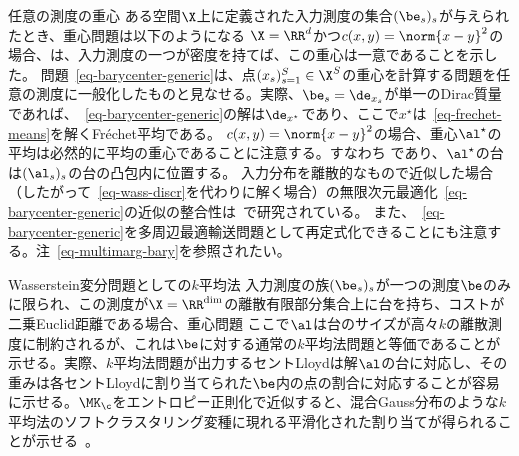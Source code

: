 \begin{rem2}{任意の測度の重心}\label{rem-bary-carlier}
	ある空間$\X$上に定義された入力測度の集合$(\be_s)_s$が与えられたとき、重心問題は以下のようになる
	$\X=\RR^d$かつ$c(x,y)=\norm{x-y}^2$の場合、\citet{Carlier_wasserstein_barycenter}は、入力測度の一つが密度を持てば、この重心は一意であることを示した。
	問題~\eqref{eq-barycenter-generic}は、点$(x_s)_{s=1}^S \in \X^S$の重心を計算する問題を任意の測度に一般化したものと見なせる。実際、$\be_s=\de_{x_s}$が単一のDirac質量であれば、~\eqref{eq-barycenter-generic}の解は$\de_{x^\star}$であり、ここで$x^\star$は~\eqref{eq-frechet-means}を解くFréchet平均である。
	$c(x,y)=\norm{x-y}^2$の場合、重心$\al^\star$の平均は必然的に平均の重心であることに注意する。すなわち
	であり、$\al^\star$の台は$(\al_s)_s$の台の凸包内に位置する。
	入力分布を離散的なもので近似した場合（したがって~\eqref{eq-wass-discr}を代わりに解く場合）の無限次元最適化~\eqref{eq-barycenter-generic}の近似の整合性は~\citet{Carlier-NumericsBarycenters}で研究されている。
	また、~\eqref{eq-barycenter-generic}を多周辺最適輸送問題として再定式化できることにも注意する。注~\ref{eq-multimarg-bary}を参照されたい。
\end{rem2}

\begin{rem2}{Wasserstein変分問題としての$k$平均法}\label{rem-bary-kmeans}
入力測度の族$(\be_s)_s$が一つの測度$\be$のみに限られ、この測度が$\X=\RR^{\dim}$の離散有限部分集合上に台を持ち、コストが二乗Euclid距離である場合、重心問題
ここで$\al$は台のサイズが高々$k$の離散測度に制約されるが、これは$\be$に対する通常の$k$平均法問題と等価であることが示せる。実際、$k$平均法問題が出力するセントLloydは解$\al$の台に対応し、その重みは各セントLloydに割り当てられた$\be$内の点の割合に対応することが容易に示せる。$\MK_{\c}$をエントロピー正則化で近似すると、混合Gauss分布のような$k$平均法のソフトクラスタリング変種に現れる平滑化された割り当てが得られることが示せる~\citep{dessein2017parameter}。
\end{rem2}

